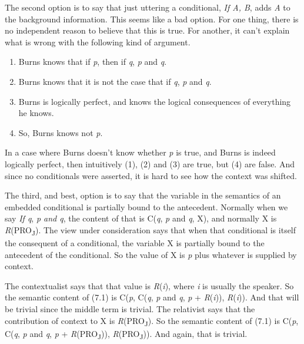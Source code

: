 \documentclass[
  11pt,
  letterpaper,
  DIV=11,
  numbers=noendperiod,
  twoside]{scrartcl}
\providecommand{\tightlist}{%
  \setlength{\itemsep}{0pt}\setlength{\parskip}{0pt}}
\begin{document}
The second option is to say that just uttering a conditional, \emph{If
A, B}, adds \emph{A} to the background information. This seems like a
bad option. For one thing, there is no independent reason to believe
that this is true. For another, it can't explain what is wrong with the
following kind of argument.

\begin{enumerate}
\def\labelenumi{\arabic{enumi}.}
\tightlist
\item
  Burns knows that if \emph{p}, then if \emph{q}, \emph{p} and \emph{q}.
\item
  Burns knows that it is not the case that if \emph{q}, \emph{p} and
  \emph{q}.
\item
  Burns is logically perfect, and knows the logical consequences of
  everything he knows.
\item
  So, Burns knows not \emph{p}.
\end{enumerate}

In a case where Burns doesn't know whether \emph{p} is true, and Burns
is indeed logically perfect, then intuitively (1), (2) and (3) are true,
but (4) are false. And since no conditionals were asserted, it is hard
to see how the context was shifted.

The third, and best, option is to say that the variable in the semantics
of an embedded conditional is partially bound to the antecedent.
Normally when we say \emph{If q}, \emph{p and q}, the content of that is
C(\emph{q}, \emph{p} and \emph{q}, X), and normally X is
\emph{R}(PRO\textsubscript{J}). The view under consideration says that
when that conditional is itself the consequent of a conditional, the
variable X is partially bound to the antecedent of the conditional. So
the value of X is \emph{p} plus whatever is supplied by context.

The contextualist says that that value is \emph{R}(\emph{i}), where
\emph{i} is usually the speaker. So the semantic content of (7.1) is
C(\emph{p}, C(\emph{q}, \emph{p} and \emph{q}, \emph{p} +
\emph{R}(\emph{i})), \emph{R}(\emph{i})). And that will be trivial since
the middle term is trivial. The relativist says that the contribution of
context to X is \emph{R}(PRO\textsubscript{J}). So the semantic content
of (7.1) is C(\emph{p}, C(\emph{q}, \emph{p} and \emph{q}, \emph{p} +
\emph{R}(PRO\textsubscript{J})), \emph{R}(PRO\textsubscript{J})). And
again, that is trivial.
\end{document}
